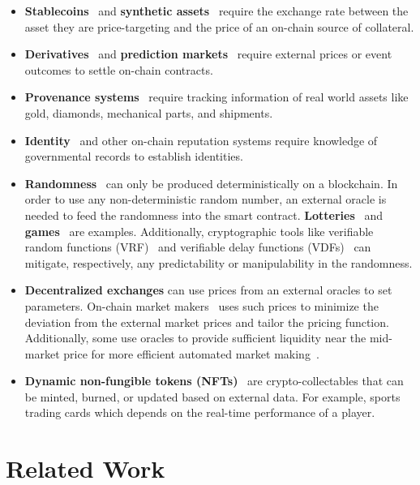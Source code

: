 \begin{itemize}

\item \textbf{Stablecoins}~\cite{clark2019sok,MSS20,PHP+19,gu2020empirical,MAKERDAOOracle} and \textbf{synthetic assets}~\cite{SCM21} require the exchange rate between the asset they are price-targeting and the price of an on-chain source of collateral. 
\item \textbf{Derivatives}~\cite{eskandari2017feasibility,biryukov2017findel,synthetix} and \textbf{prediction markets}~\cite{clark2014decentralizing,peterson2015augur} require external prices or event outcomes to settle on-chain contracts.
\item \textbf{Provenance systems}~\cite{RKYCC19,tian2016agri} require tracking information of real world assets like gold, diamonds, mechanical parts, and shipments.
\item \textbf{Identity}~\cite{KL17,maram2021candid} and other on-chain reputation systems require knowledge of governmental records to establish identities.
\item \textbf{Randomness}~\cite{chainlinkvrf} can only be produced deterministically on a blockchain. In order to use any non-deterministic random number, an external oracle is needed to feed the randomness into the smart contract. \textbf{Lotteries}~\cite{pooltogether} and \textbf{games}~\cite{etheroll} are examples. Additionally, cryptographic tools like verifiable random functions (VRF)~\cite{micali1999verifiable,goldbe-vrf-01} and verifiable delay functions (VDFs)~\cite{bunz2017proofs,crypto-2018-28858} can mitigate, respectively, any predictability or manipulability in the randomness.
\item \textbf{Decentralized exchanges} can use prices from an external oracles to set parameters. On-chain market makers~\cite{hertzog2017bancor} uses such prices to minimize the deviation from the external market prices and tailor the pricing function. Additionally, some use oracles to provide sufficient liquidity near the mid-market price for more efficient automated market making~\cite{dodopmm,cofixwhitepaper,cofixblog}.
\item \textbf{Dynamic non-fungible tokens (NFTs)}~\cite{chainlinknft} are crypto-collectables that can be minted, burned, or updated based on external data. For example, sports trading cards which depends on the real-time performance of a player.
\end{itemize}

\section{Related Work}

